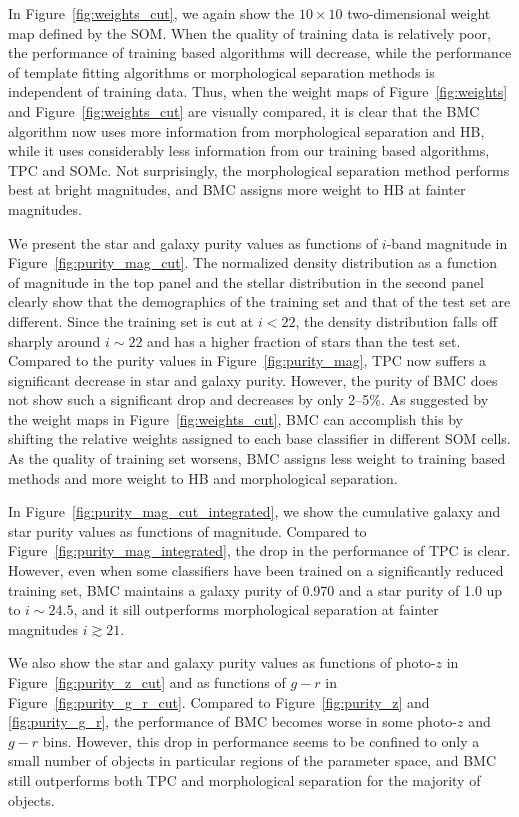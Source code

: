 In Figure~\ref{fig:weights_cut}, we again show the $10\times10$
two-dimensional weight map defined by the SOM.
When the quality of training data is relatively poor,
the performance of training based algorithms will decrease,
while the performance of template fitting algorithms
or morphological separation methods
is independent of training data.
Thus, when the weight maps of Figure~\ref{fig:weights}
and Figure~\ref{fig:weights_cut} are visually compared,
it is clear that
the BMC algorithm now uses more information from
morphological separation and HB,
while it uses considerably less information from 
our training based algorithms, TPC and SOMc.
Not surprisingly, the morphological separation method
performs best at bright magnitudes,
and BMC assigns more weight to HB at fainter magnitudes.

We present the star and galaxy purity values as functions of
$i$-band magnitude in Figure~\ref{fig:purity_mag_cut}.
The normalized density distribution as a function of magnitude
in the top panel
and the stellar distribution in the second panel
clearly show that the demographics of the training set and 
that of the test set are different.
Since the training set is cut at $i < 22$,
the density distribution falls off sharply around $i \sim 22$
and has a higher fraction of stars than the test set.
Compared to the purity values in Figure~\ref{fig:purity_mag},
TPC now suffers a significant decrease in star and galaxy purity.
However, the purity of BMC does not show such a significant drop
and decreases by only 2--5\%.
As suggested by the weight maps in Figure~\ref{fig:weights_cut},
BMC can accomplish this by shifting the relative weights assigned to
each base classifier in different SOM cells.
As the quality of training set worsens,
BMC assigns less weight to training based methods
and more weight to HB and morphological separation.

In Figure~\ref{fig:purity_mag_cut_integrated}, we show the
cumulative galaxy and star purity values as functions of magnitude.
Compared to Figure~\ref{fig:purity_mag_integrated},
the drop in the performance of TPC is clear.
However, even when some classifiers have been trained on
a significantly reduced training set,
BMC maintains a galaxy purity of 0.970 and a star purity of 1.0
up to $i \sim 24.5$, and it sill outperforms morphological separation
at fainter magnitudes $i \gtrsim 21$.


We also show the star and galaxy purity values as functions of
photo-$z$ in Figure~\ref{fig:purity_z_cut}
and as functions of $g-r$ in Figure~\ref{fig:purity_g_r_cut}.
Compared to Figure~\ref{fig:purity_z} and \ref{fig:purity_g_r},
the performance of BMC becomes worse in some photo-$z$ and $g-r$ bins.
However, this drop in performance seems to be confined to
only a small number of objects in particular regions of
the parameter space,
and BMC still outperforms both TPC and morphological separation
for the majority of objects.


